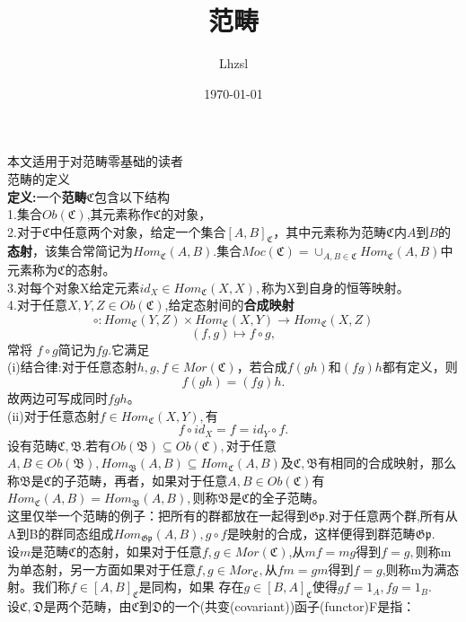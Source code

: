 \documentclass[UTF8]{article}
\title{范畴}
\author{Lhzsl}
\date{\today }
\begin{document}
	\maketitle
	本文适用于对范畴零基础的读者\\
 范畴的定义\\
  \textbf{定义:}一个\textbf{范畴}$\mathfrak{C}$包含以下结构\\
  1.集合$Ob(\mathfrak{C})$,其元素称作$\mathfrak{C}$的对象，\\
  2.对于$\mathfrak{C}$中任意两个对象，给定一个集合$[A,B]_{\mathfrak{C}}$，其中元素称为范畴$\mathfrak{C}$内$A$到$B$的\textbf{态射}，该集合常简记为$Hom_{\mathfrak{C}}(A,B).$集合$Moc(\mathfrak{C})=\cup_{A,B\in \mathfrak{C}}Hom_{\mathfrak{C}}(A,B)$中元素称为$\mathfrak{C}$的态射。\\
  3.对每个对象X给定元素$id_{X}\in Hom_{\mathfrak{C}}(X,X),$称为X到自身的恒等映射。\\
  4.对于任意$X,Y,Z\in Ob(\mathfrak{C})$,给定态射间的\textbf{合成映射}\\
 $$ \circ:Hom_{\mathfrak{C}}(Y,Z)\times Hom_{\mathfrak{C}}(X,Y)\longrightarrow Hom_{\mathfrak{C}}(X,Z)
  $$
  $$
  (f,g)\mapsto f\circ g,
  $$
  常将 $f\circ g$简记为$fg$.它满足\\
  (i)结合律:对于任意态射$h,g,f\in Mor(\mathfrak{C})$，若合成$f(gh)$和$(fg)h$都有定义，则$$
  f(gh)=(fg)h.
  $$
  故两边可写成同时$fgh$。\\
  (ii)对于任意态射$f\in Hom_{\mathfrak{C}}(X,Y),$有$$
  f\circ id_{X}=f=id_{Y}\circ f.
  $$
  设有范畴$\mathfrak{C},\mathfrak{B}$.若有$Ob(\mathfrak{B})\subseteq Ob(\mathfrak{C}),$对于任意$A,B\in Ob(\mathfrak{B}),Hom_{\mathfrak{B}}(A,B)\subseteq Hom_{\mathfrak{C}}(A,B)$及$\mathfrak{C},\mathfrak{B}$有相同的合成映射，那么称$\mathfrak{B}$是$\mathfrak{C}$的子范畴，再者，如果对于任意$A,B\in Ob(\mathfrak{C})$有$Hom_{\mathfrak{C}}(A,B)=Hom_{\mathfrak{B}}(A,B),$则称$\mathfrak{B}$是$\mathfrak{C}$的全子范畴。\\
  这里仅举一个范畴的例子：把所有的群都放在一起得到$\mathfrak{Gp}.$对于任意两个群,所有从A到B的群同态组成$Hom_{\mathfrak{Gp}}(A,B),g\circ f$是映射的合成，这样便得到群范畴$\mathfrak{Gp}.$\\
  设$m$是范畴$\mathfrak{C}$的态射，如果对于任意$f,g\in Mor(\mathfrak{C})$,从$mf=mg$得到$f=g,$则称m为单态射，另一方面如果对于任意$f,g\in Mor_{\mathfrak{C}},$从$fm=gm$得到$f=g$,则称m为满态射。我们称$f\in [A,B]_{\mathfrak{C}}$是同构，如果 存在$g\in [B,A]_{\mathfrak{C}}$使得$gf=1_{A},fg=1_{B}.$\\
  设$\mathfrak{C},\mathfrak{D}$是两个范畴，由$\mathfrak{C}$到$\mathfrak{D}$的一个(共变(covariant))函子(functor)F是指：\\
\end{document}
